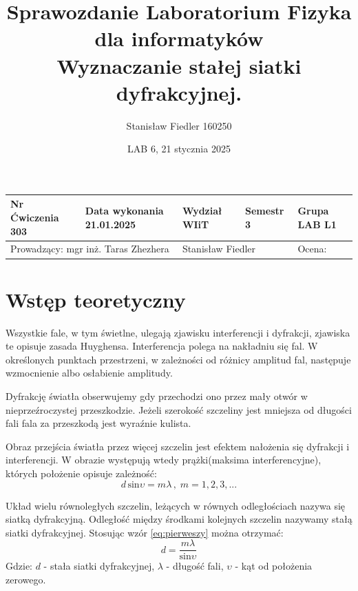 \documentclass[a4paper, 11pt]{article}
\title{%
        \vspace{-1cm}
       \large Sprawozdanie Laboratorium Fizyka dla informatyków \\
       \huge Wyznaczanie stałej siatki dyfrakcyjnej.}
\author{Stanisław Fiedler 160250}
\date{LAB 6, 21 stycznia 2025}
\begin{document}
\begin{table}
	\begin{adjustwidth}{-0.25\textwidth}{-0.25\textwidth}
		\begin{center}
			\begin{tabular}{|l|l|l|l|l|}
				\hline
				Nr Ćwiczenia 303                                             & Data wykonania 21.01.2025                 & Wydział WIiT & Semestr 3 & Grupa LAB L1 \\
				\hline
				\multicolumn{2}{|l|}{ Prowadzący: mgr inż. Taras Zhezhera  } & \multicolumn{2}{|l|}{ Stanisław Fiedler } & Ocena:                                  \\
				\hline
			\end{tabular}
		\end{center}
	\end{adjustwidth}
\end{table}

\maketitle
\tableofcontents

\section{Wstęp teoretyczny}\label{sec:wstep} %

Wszystkie fale, w tym świetlne, ulegają zjawisku interferencji i dyfrakcji, zjawiska te opisuje zasada Huyghensa.
Interferencja polega na nakładniu się fal.
W określonych punktach przestrzeni, w zależności od różnicy amplitud fal, następuje wzmocnienie albo osłabienie amplitudy.

Dyfrakcję światła obserwujemy gdy przechodzi ono przez mały otwór w nieprzeźroczystej przeszkodzie.
Jeżeli szerokość szczeliny jest mniejsza od długości fali fala za przeszkodą jest wyraźnie kulista.

Obraz przejścia światła przez więcej szczelin jest efektem nałożenia się dyfrakcji i interferencji.
W obrazie występują wtedy prążki(maksima interferencyjne), których położenie opisuje zależność:
\begin{equation}\label{eq:pierweszy}
	d\,\text{sin}\upsilon = m\lambda\, , \; m = 1,2,3,...
\end{equation}

Układ wielu równoległych szczelin, leżących w równych odległościach nazywa się siatką dyfrakcyjną.
Odległość między środkami kolejnych szczelin nazywamy stałą siatki dyfrakcyjnej.
Stosując wzór \eqref{eq:pierweszy} można otrzymać:
\begin{equation}\label{eq:drugi}
	d = \frac{m\lambda}{\text{sin}\upsilon}
\end{equation}
Gdzie: $d$ - stała siatki dyfrakcyjnej, $\lambda$ - długość fali, $\upsilon$ - kąt od położenia zerowego.
\end{document}
